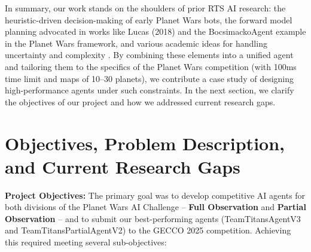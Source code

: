 \documentclass[conference]{IEEEtran}
\begin{document}
In summary, our work stands on the shoulders of prior RTS AI research: the heuristic-driven decision-making of early Planet Wars bots, the forward model planning advocated in works like Lucas (2018) \cite{lucas2018} and the BocsimackoAgent example in the Planet Wars framework, and various academic ideas for handling uncertainty and complexity \cite{buro2003,ontanon2013,silver2010,cowling2012}. By combining these elements into a unified agent and tailoring them to the specifics of the Planet Wars competition (with 100ms time limit and maps of 10--30 planets), we contribute a case study of designing high-performance agents under such constraints. In the next section, we clarify the objectives of our project and how we addressed current research gaps.

\section{Objectives, Problem Description, and Current Research Gaps}

\textbf{Project Objectives:} The primary goal was to develop competitive AI agents for both divisions of the Planet Wars AI Challenge -- \textbf{Full Observation} and \textbf{Partial Observation} -- and to submit our best-performing agents (TeamTitansAgentV3 and TeamTitansPartialAgentV2) to the GECCO 2025 competition. Achieving this required meeting several sub-objectives:
\end{document}
